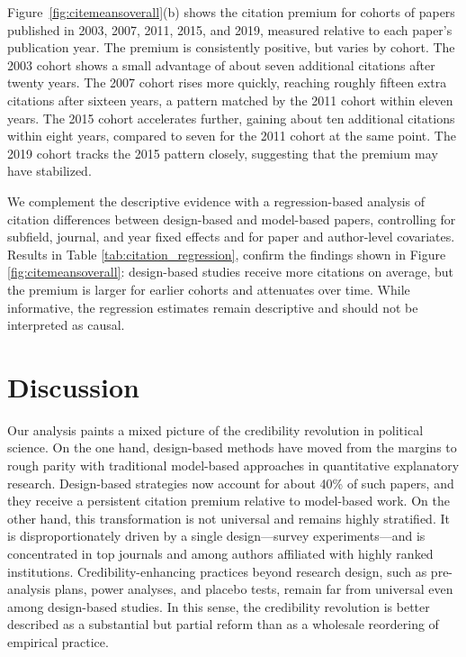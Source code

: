 \documentclass[12pt]{article}
\begin{document}
Figure~\ref{fig:citemeansoverall}(b) shows the citation premium for cohorts of papers published in 2003, 2007, 2011, 2015, and 2019, measured relative to each paper's publication year. The premium is consistently positive, but varies by cohort. The 2003 cohort shows a small advantage of about seven additional citations after twenty years. The 2007 cohort rises more quickly, reaching roughly fifteen extra citations after sixteen years, a pattern matched by the 2011 cohort within eleven years. The 2015 cohort accelerates further, gaining about ten additional citations within eight years, compared to seven for the 2011 cohort at the same point. The 2019 cohort tracks the 2015 pattern closely, suggesting that the premium may have stabilized. 

We complement the descriptive evidence with a regression-based analysis of citation differences between design-based and model-based papers, controlling for subfield, journal, and year fixed effects and for paper and author-level covariates. Results in Table \ref{tab:citation_regression}, confirm the findings shown in Figure \ref{fig:citemeansoverall}: design-based studies receive more citations on average, but the premium is larger for earlier cohorts and attenuates over time. While informative, the regression estimates remain descriptive and should not be interpreted as causal.
 

\FloatBarrier

\section*{Discussion}\label{sec:discussion}

Our analysis paints a mixed picture of the credibility revolution in political science. On the one hand, design-based methods have moved from the margins to rough parity with traditional model-based approaches in quantitative explanatory research. Design-based strategies now account for about 40\% of such papers, and they receive a persistent citation premium relative to model-based work. On the other hand, this transformation is not universal and remains highly stratified. It is disproportionately driven by a single design---survey experiments---and is concentrated in top journals and among authors affiliated with highly ranked institutions. Credibility-enhancing practices beyond research design, such as pre-analysis plans, power analyses, and placebo tests, remain far from universal even among design-based studies. In this sense, the credibility revolution is better described as a substantial but partial reform than as a wholesale reordering of empirical practice.
\end{document}

